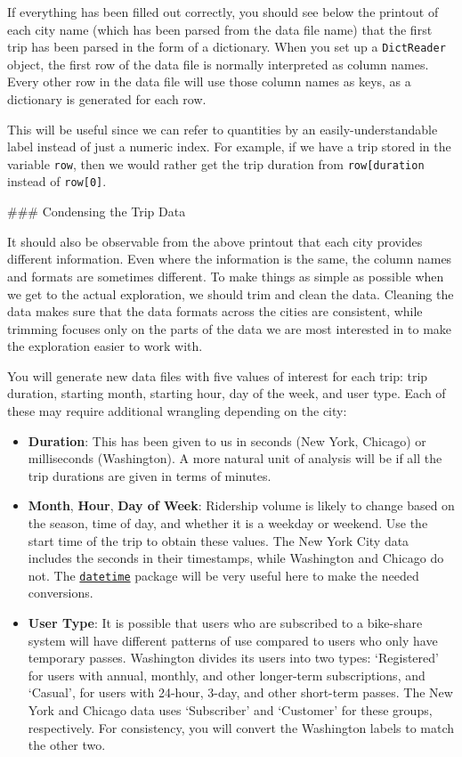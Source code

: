 \documentclass[11pt]{article}
\providecommand{\tightlist}{%
      \setlength{\itemsep}{0pt}\setlength{\parskip}{0pt}}
\begin{document}
    If everything has been filled out correctly, you should see below the
printout of each city name (which has been parsed from the data file
name) that the first trip has been parsed in the form of a dictionary.
When you set up a \texttt{DictReader} object, the first row of the data
file is normally interpreted as column names. Every other row in the
data file will use those column names as keys, as a dictionary is
generated for each row.

This will be useful since we can refer to quantities by an
easily-understandable label instead of just a numeric index. For
example, if we have a trip stored in the variable \texttt{row}, then we
would rather get the trip duration from
\texttt{row{[}\textquotesingle{}duration\textquotesingle{}{]}} instead
of \texttt{row{[}0{]}}.

 \#\#\# Condensing the Trip Data

It should also be observable from the above printout that each city
provides different information. Even where the information is the same,
the column names and formats are sometimes different. To make things as
simple as possible when we get to the actual exploration, we should trim
and clean the data. Cleaning the data makes sure that the data formats
across the cities are consistent, while trimming focuses only on the
parts of the data we are most interested in to make the exploration
easier to work with.

You will generate new data files with five values of interest for each
trip: trip duration, starting month, starting hour, day of the week, and
user type. Each of these may require additional wrangling depending on
the city:

\begin{itemize}
\tightlist
\item
  \textbf{Duration}: This has been given to us in seconds (New York,
  Chicago) or milliseconds (Washington). A more natural unit of analysis
  will be if all the trip durations are given in terms of minutes.
\item
  \textbf{Month}, \textbf{Hour}, \textbf{Day of Week}: Ridership volume
  is likely to change based on the season, time of day, and whether it
  is a weekday or weekend. Use the start time of the trip to obtain
  these values. The New York City data includes the seconds in their
  timestamps, while Washington and Chicago do not. The
  \href{https://docs.python.org/3/library/datetime.html}{\texttt{datetime}}
  package will be very useful here to make the needed conversions.
\item
  \textbf{User Type}: It is possible that users who are subscribed to a
  bike-share system will have different patterns of use compared to
  users who only have temporary passes. Washington divides its users
  into two types: `Registered' for users with annual, monthly, and other
  longer-term subscriptions, and `Casual', for users with 24-hour,
  3-day, and other short-term passes. The New York and Chicago data uses
  `Subscriber' and `Customer' for these groups, respectively. For
  consistency, you will convert the Washington labels to match the other
  two.
\end{itemize}
\end{document}
